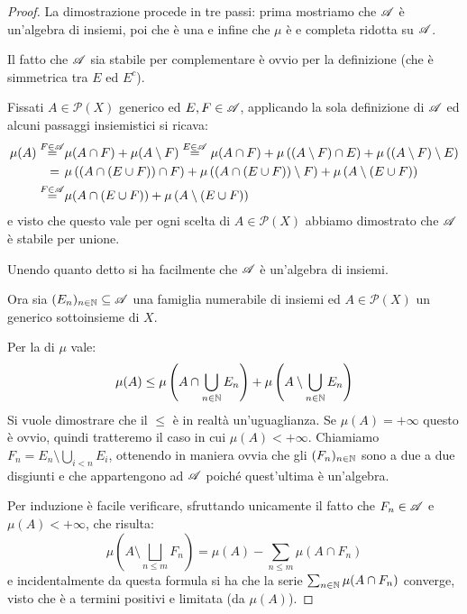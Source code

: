\begin{proof}
	La dimostrazione procede in tre passi: prima mostriamo che $\mathscr A$ è un'algebra di insiemi, poi che è una \sigalg{} e infine che $\mu$ è \sigadd{} e completa ridotta su $\mathscr A$.
	
	Il fatto che $\mathscr A$ sia stabile per complementare è ovvio per la definizione (che è simmetrica tra $E$ ed $E^c$).
	
	Fissati $A\in\mathcal P(X)$ generico ed $E,F\in\mathscr A$, applicando la sola definizione di $\mathscr A$ ed alcuni passaggi insiemistici si ricava:
	\begin{align*}
		\mu(A)\stackrel{F\in\mathscr A}{=}&\mu(A\cap F)+\mu(A\setminus F)\stackrel{E\in\mathscr A}{=}
		\mu(A\cap F)+\mu\left((A\setminus F)\cap E\right)+\mu\left((A\setminus F)\setminus E\right)\\
		=\hspace{0.4em}&\mu\left((A\cap (E\cup F))\cap F\right)+\mu\left((A\cap (E\cup F))\setminus F\right)+
		\mu\left(A\setminus(E\cup F)\right)\\
		\stackrel{F\in\mathscr A}{=}&\mu(A\cap (E\cup F))+\mu\left(A\setminus(E\cup F)\right)
	\end{align*}
	e visto che questo vale per ogni scelta di $A\in\mathcal P(X)$ abbiamo dimostrato che $\mathscr A$ è stabile per unione.
	
	Unendo quanto detto si ha facilmente che $\mathscr A$ è un'algebra di insiemi.
	
	Ora sia $(E_n)_{n\in\mathbb N}\subseteq \mathscr A$ una famiglia numerabile di insiemi ed $A\in\mathcal P(X)$ un generico sottoinsieme di $X$.
	
	Per la \sigsubadd[ità] di $\mu$ vale:
	\begin{equation}\label{eq:DisuguaglianzaFacileCaratheodory}
		\mu(A)\le \mu\left(A\cap\bigcup_{n\in\mathbb N} E_n\right)+\mu\left(A\setminus\bigcup_{n\in\mathbb N} E_n\right)
	\end{equation}
	Si vuole dimostrare che il $\le$ è in realtà un'uguaglianza. Se $\mu(A)=+\infty$ questo è ovvio, quindi tratteremo il caso in cui $\mu(A)<+\infty$. Chiamiamo $F_n=E_n\setminus \bigcup_{i<n} E_i$, ottenendo in maniera ovvia che gli $(F_n)_{n\in\mathbb N}$ sono a due a due disgiunti e che appartengono ad $\mathscr A$ poiché quest'ultima è un'algebra.
	
	Per induzione è facile verificare, sfruttando unicamente il fatto che $F_n\in\mathscr A$ e $\mu(A)<+\infty$, che risulta:
	\begin{equation}\label{eq:IdentitaDifferenzaCaratheodory}
		\mu\left(A\setminus \bigsqcup_{n\le m} F_n\right)=\mu(A)-\sum_{n\le m} \mu(A\cap F_n)
	\end{equation}
	e incidentalmente da questa formula si ha che la serie $\sum_{n\in\mathbb N}\mu(A\cap F_n)$ converge, visto che è a termini positivi e limitata (da $\mu(A)$).
	

\end{proof}

